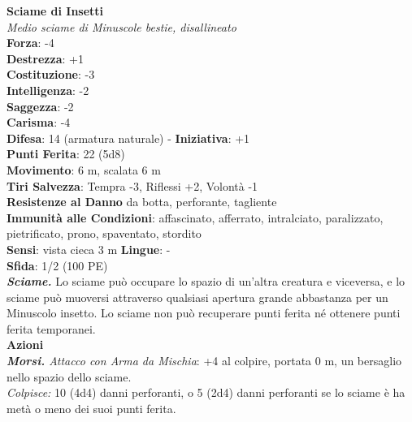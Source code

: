 \begin{multicols}{2}
\medskip\textbf{Sciame di Insetti}\\
\emph{Medio sciame di Minuscole bestie, disallineato}\\
\textbf{Forza}: -4\\
\textbf{Destrezza}: +1\\
\textbf{Costituzione}: -3\\
\textbf{Intelligenza}: -2\\
\textbf{Saggezza}: -2\\
\textbf{Carisma}: -4\\
\textbf{Difesa}: 14 (armatura naturale) - \textbf{Iniziativa}: +1\\
\textbf{Punti Ferita}: 22 (5d8)\\
\textbf{Movimento}: 6 m, scalata 6 m\\
\textbf{Tiri Salvezza}: Tempra -3, Riflessi +2, Volontà -1\\
\textbf{Resistenze al Danno} da botta, perforante, tagliente\\
\textbf{Immunità alle Condizioni}: affascinato, afferrato, intralciato, paralizzato, pietrificato, prono, spaventato, stordito\\
\textbf{Sensi}: vista cieca 3 m
\textbf{Lingue}: -\\
\textbf{Sfida}: 1/2 (100 PE)\smallskip\\
\emph{\textbf{Sciame.}} Lo sciame può occupare lo spazio di un'altra creatura e viceversa, e lo sciame può muoversi attraverso qualsiasi apertura grande abbastanza per un Minuscolo insetto. Lo sciame non può recuperare punti ferita né ottenere punti ferita temporanei.\\
\smallskip\textbf{Azioni}\\
\emph{\textbf{Morsi.} Attacco con Arma da Mischia}: +4 al colpire, portata 0 m, un bersaglio nello spazio dello sciame.\\
\emph{Colpisce:} 10 (4d4) danni perforanti, o 5 (2d4) danni perforanti se lo sciame è ha metà o meno dei suoi punti ferita.\\


\end{multicols}
